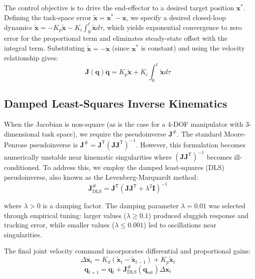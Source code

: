 \documentclass[12pt,a4paper,oneside]{report}
\begin{document}
The control objective is to drive the end-effector to a desired target position $\mathbf{x}^*$. Defining the task-space error $\tilde{\mathbf{x}} = \mathbf{x}^* - \mathbf{x}$, we specify a desired closed-loop dynamics $\dot{\tilde{\mathbf{x}}} = -K_p \tilde{\mathbf{x}} - K_i \int_0^t \tilde{\mathbf{x}} d\tau$, which yields exponential convergence to zero error for the proportional term and eliminates steady-state offset with the integral term. Substituting $\dot{\tilde{\mathbf{x}}} = -\dot{\mathbf{x}}$ (since $\mathbf{x}^*$ is constant) and using the velocity relationship gives:
\begin{equation}\mathbf{J}(\mathbf{q}) \dot{\mathbf{q}} = K_p \tilde{\mathbf{x}} + K_i \int_0^t \tilde{\mathbf{x}} d\tau
\end{equation}
\subsection{Damped Least-Squares Inverse Kinematics}
\label{subsec:damped_least_squares_inverse_kinematics}

When the Jacobian is non-square (as is the case for a 4-DOF manipulator with 3-dimensional task space), we require the pseudoinverse $\mathbf{J}^{\#}$. The standard Moore-Penrose pseudoinverse is $\mathbf{J}^{\#} = \mathbf{J}^{\mathsf{T}} (\mathbf{J} \mathbf{J}^{\mathsf{T}})^{-1}$. However, this formulation becomes numerically unstable near kinematic singularities where $(\mathbf{J} \mathbf{J}^{\mathsf{T}})^{-1}$ becomes ill-conditioned. To address this, we employ the damped least-squares (DLS) pseudoinverse, also known as the Levenberg-Marquardt method:
\begin{equation}\mathbf{J}^{\#}_{\text{DLS}} = \mathbf{J}^{\mathsf{T}} (\mathbf{J} \mathbf{J}^{\mathsf{T}} + \lambda^2 \mathbf{I})^{-1}
\end{equation}

where $\lambda > 0$ is a damping factor. The damping parameter $\lambda = 0.01$ was selected through empirical tuning: larger values ($\lambda \geq 0.1$) produced sluggish response and tracking error, while smaller values ($\lambda \leq 0.001$) led to oscillations near singularities.

The final joint velocity command incorporates differential and proportional gains:
\begin{equation}\Delta \mathbf{x}_t = K_d (\tilde{\mathbf{x}}_t - \tilde{\mathbf{x}}_{t-1}) + K_p \tilde{\mathbf{x}}_t
\end{equation}
\begin{equation}\mathbf{q}_{t+1} = \mathbf{q}_t + \mathbf{J}^{\#}_{\text{DLS}}(\mathbf{q}_{\text{est}}) \Delta \mathbf{x}_t
\end{equation}
\end{document}
